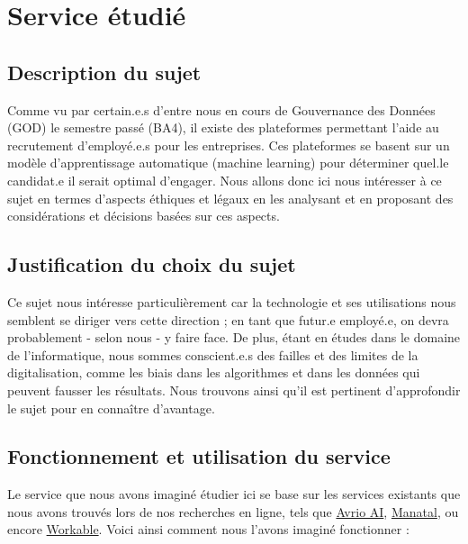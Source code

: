 \section{Service étudié}\label{section:description_projet}

\subsection{Description du sujet}
Comme vu par certain.e.s d’entre nous en cours de Gouvernance des Données (GOD) le semestre passé (BA4), il existe des plateformes permettant l’aide au recrutement d’employé.e.s pour les entreprises. Ces plateformes se basent sur un modèle d'apprentissage automatique (machine learning) pour déterminer quel.le candidat.e il serait optimal d’engager. Nous allons donc ici nous intéresser à ce sujet en termes d’aspects éthiques et légaux en les analysant et en proposant des considérations et décisions basées sur ces aspects.

\subsection{Justification du choix du sujet}
Ce sujet nous intéresse particulièrement car la technologie et ses utilisations nous semblent se diriger vers cette direction ; en tant que futur.e employé.e, on devra probablement - selon nous - y faire face. De plus, étant en études dans le domaine de l’informatique, nous sommes conscient.e.s des failles et des limites de la digitalisation, comme les biais dans les algorithmes et dans les données qui peuvent fausser les résultats. Nous trouvons ainsi qu’il est pertinent d’approfondir le sujet pour en connaître d’avantage.

\subsection{Fonctionnement et utilisation du service}
Le service que nous avons imaginé étudier ici se base sur les services existants que nous avons trouvés lors de nos recherches en ligne, tels que \href{https://www.avrioai.com}{Avrio AI}, \href{https://www.manatal.com/?matchtype=e&adposition=&locphysicalid=1003191&device=c&utm_source=google&utm_medium=cpc&utm_term=ai%20recruiting%20software&utm_campaign=Switzerland_Search%20%7C%20Generic%20&%20Competitor%20Terms%20-%20ST&hsa_ver=3&hsa_ad=593873401673&hsa_cam=16975333135&hsa_tgt=kwd-382632061851&hsa_net=adwords&hsa_grp=135358698146&hsa_mt=e&hsa_src=g&hsa_kw=ai%20recruiting%20software&hsa_acc=9327528136&gclid=CjwKCAiAwomeBhBWEiwAM43YIBCeUxhnE7AhArtbkOJ4XJ5QOkSP0W2lle4zfltyFzJruynzU8IqUhoCOVwQAvD_BwE}{Manatal}, ou encore \href{https://www.workable.com}{Workable}. Voici ainsi comment nous l'avons imaginé fonctionner :\newline

